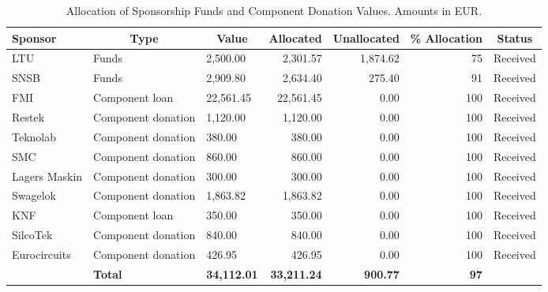 \documentclass[a4paper,12pt,oneside]{article}
\providecommand{\DIFaddbeginFL}{} %
\providecommand{\DIFaddendFL}{} %
\providecommand{\DIFdelbeginFL}{} %
\providecommand{\DIFdelendFL}{} %
\newcommand{\DIFscaledelfig}{0.5}
\newlength{\DIFdelgraphicswidth} %
\newlength{\DIFdelgraphicsheight} %
\newcommand{\DIFaddincludegraphics}[2][]{{\color{blue}\fbox{\DIFOincludegraphics[#1]{#2}}}} %
\newcommand{\DIFdelincludegraphics}[2][]{%
\sbox{\DIFdelgraphicsbox}{\DIFOincludegraphics[#1]{#2}}%
\settoboxwidth{\DIFdelgraphicswidth}{\DIFdelgraphicsbox} %
\settoboxtotalheight{\DIFdelgraphicsheight}{\DIFdelgraphicsbox} %
\scalebox{\DIFscaledelfig}{%
\parbox[b]{\DIFdelgraphicswidth}{\usebox{\DIFdelgraphicsbox}\\[-\baselineskip] \rule{\DIFdelgraphicswidth}{0em}}\llap{\resizebox{\DIFdelgraphicswidth}{\DIFdelgraphicsheight}{%
\setlength{\unitlength}{\DIFdelgraphicswidth}%
\begin{picture}(1,1)%
\thicklines\linethickness{2pt} %
{\color[rgb]{1,0,0}\put(0,0){\framebox(1,1){}}}%
{\color[rgb]{1,0,0}\put(0,0){\line( 1,1){1}}}%
{\color[rgb]{1,0,0}\put(0,1){\line(1,-1){1}}}%
\end{picture}%
}\hspace*{3pt}}} %
} %
\DeclareRobustCommand{\DIFaddbeginFL}{\DIFOaddbeginFL \let\includegraphics\DIFaddincludegraphics} %
\DeclareRobustCommand{\DIFaddendFL}{\DIFOaddendFL \let\includegraphics\DIFOincludegraphics} %
\DeclareRobustCommand{\DIFdelbeginFL}{\DIFOdelbeginFL \let\includegraphics\DIFdelincludegraphics} %
\DeclareRobustCommand{\DIFdelendFL}{\DIFOaddendFL \let\includegraphics\DIFOincludegraphics} %
\begin{document}
\begin{table}[H]
\centering
\begin{tabular}{l|m{}|l|r|r|r|c}
\hline
\multicolumn{1}{|l|}{\textbf{Sponsor}} & \multicolumn{1}{|c|}{\textbf{Type}} & \multicolumn{1}{c|}{\textbf{Value}} & \multicolumn{1}{c|}{\textbf{Allocated}} & \multicolumn{1}{c|}{\textbf{Unallocated}} & \multicolumn{1}{c|}{\textbf{\% Allocation}} & \multicolumn{1}{c|}{\textbf{Status}} \\ \hline
\multicolumn{1}{|l|}{LTU} & Funds & 2,500.00 & 2,301.57 & 1,874.62 & 75 & \multicolumn{1}{c|}{Received} \\ \hline
\multicolumn{1}{|l|}{SNSB} & Funds & 2,909.80 & 2,634.40 & 275.40 & 91 & \multicolumn{1}{c|}{Received} \\ \hline
\multicolumn{1}{|l|}{FMI} & Component loan & 22,561.45 & 22,561.45 & 0.00 & 100 & \DIFdelbeginFL %
\DIFdelendFL \DIFaddbeginFL \multicolumn{1}{c|}{Received} \DIFaddendFL \\ \hline
\multicolumn{1}{|l|}{Restek} & Component donation & 1,120.00 & 1,120.00 & 0.00 & 100 & \multicolumn{1}{c|}{Received} \\ \hline
\multicolumn{1}{|l|}{Teknolab} & Component donation & 380.00 & 380.00 & 0.00 & 100 & \multicolumn{1}{c|}{Received} \\ \hline
\multicolumn{1}{|l|}{SMC} & Component donation & 860.00 & 860.00 & 0.00 & 100 & \multicolumn{1}{c|}{Received} \\ \hline
\multicolumn{1}{|l|}{Lagers Maskin} & Component donation & 300.00 & 300.00 & 0.00 & 100 & \multicolumn{1}{c|}{Received} \\ \hline
\multicolumn{1}{|l|}{Swagelok} & Component donation & 1,863.82 & 1,863.82 & 0.00 & 100 & \multicolumn{1}{c|}{Received} \\ \hline
\multicolumn{1}{|l|}{KNF} & Component loan & 350.00 & 350.00 & 0.00 & 100 & \multicolumn{1}{c|}{Received} \\ \hline
\multicolumn{1}{|l|}{SilcoTek} & Component donation & 840.00 & 840.00 & 0.00 & 100 & \multicolumn{1}{c|}{Received} \\ \hline
\multicolumn{1}{|l|}{Eurocircuits} & Component donation & 426.95 & 426.95 & 0.00 & 100 & \multicolumn{1}{c|}{Received} \\ \hline
 & \multicolumn{1}{l|}{\textbf{Total}} & \textbf{34,112.01} & \textbf{33,211.24} & \textbf{900.77} & \textbf{97} & \multicolumn{1}{l}{} \\ \cline{2-6}
\end{tabular}
\caption{Allocation of Sponsorship Funds and Component Donation Values. Amounts in EUR.}
\label{table:sponsroship-allocation}
\end{table} 
\end{document}
